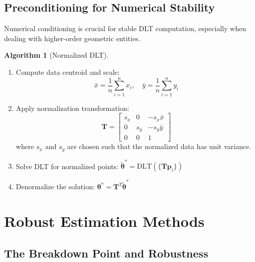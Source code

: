 \documentclass[12pt]{article}
\renewcommand{\vec}[1]{\mathbf{#1}}
\theoremstyle{definition}
\newtheorem{algorithm}{Algorithm}[section]
\begin{document}
\subsection{Preconditioning for Numerical Stability}

Numerical conditioning is crucial for stable DLT computation, especially when dealing with higher-order geometric entities.

\begin{algorithm}[Normalized DLT]
    \begin{enumerate}
        \item Compute data centroid and scale:
              \begin{equation}
                  \bar{x} = \frac{1}{n}\sum_{i=1}^n x_i, \quad \bar{y} = \frac{1}{n}\sum_{i=1}^n y_i
              \end{equation}

        \item Apply normalization transformation:
              \begin{equation}
                  \vec{T} = \begin{bmatrix}
                      s_x & 0   & -s_x\bar{x} \\
                      0   & s_y & -s_y\bar{y} \\
                      0   & 0   & 1
                  \end{bmatrix}
              \end{equation}
              where $s_x$ and $s_y$ are chosen such that the normalized data has unit variance.

        \item Solve DLT for normalized points: $\tilde{\vec{\theta}}^* = \text{DLT}(\{\vec{T}\vec{p}_i\})$

        \item Denormalize the solution: $\vec{\theta}^* = \vec{T}^T\tilde{\vec{\theta}}^*$
    \end{enumerate}
\end{algorithm}

\newpage
\section{Robust Estimation Methods}

\subsection{The Breakdown Point and Robustness}
\end{document}

